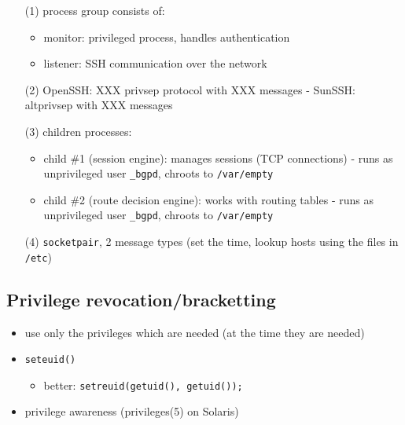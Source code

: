 \begin{itemize}
  \item[(1)] process group consists of:
    \begin{itemize}
     \item monitor: privileged process, handles authentication
     \item listener: SSH communication over the network
    \end{itemize}
  \item[(2)] OpenSSH: XXX privsep protocol with XXX messages
    - SunSSH: altprivsep with XXX messages
  \item[(3)] children processes:
    \begin{itemize}
    \item child \#1 (session engine): manages sessions (TCP connections)
    - runs as unprivileged user \texttt{\_bgpd}, chroots to \texttt{/var/empty}
    \item child \#2 (route decision engine): works with routing tables
    - runs as unprivileged user \texttt{\_bgpd}, chroots to \texttt{/var/empty}
    \end{itemize}
  \item[(4)] \texttt{socketpair}, 2 message types (set the time, lookup
     hosts using the files in \texttt{/etc})
\end{itemize}


\subsection{Privilege revocation/bracketting}

\begin{itemize}
  \item use only the privileges which are needed (at the time they are needed)
  \item \texttt{seteuid()}
    \begin{itemize}
      \item better: \texttt{setreuid(getuid(), getuid());}
    \end{itemize}
  \item privilege awareness (privileges(5) on Solaris)
\end{itemize}




